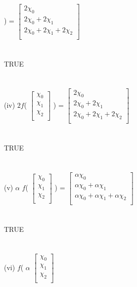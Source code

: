 \documentclass[11pt]{article}
\begin{document}
)
=
$
\begin{bmatrix}
{2\chi_{0}}\\
{2\chi_{0} + 2\chi_{1}}\\
{2\chi_{0} + 2\chi_{1} + 2\chi_{2}}\\
\end{bmatrix}$
\\
\\
\\
TRUE
\\
\\
\\
(iv)
$2f$(
$
\begin{bmatrix}
{\chi_{0}}\\
{\chi_{1}}\\
{\chi_{2}}\\
\end{bmatrix}$
)
=
$
\begin{bmatrix}
{2\chi_{0}}\\
{2\chi_{0} + 2\chi_{1}}\\
{2\chi_{0} + 2\chi_{1} + 2\chi_{2}}\\
\end{bmatrix}$
\\
\\
\\
TRUE
\\
\\
\\
(v)
$\alpha$ $f$(
$
\begin{bmatrix}
{\chi_{0}}\\
{\chi_{1}}\\
{\chi_{2}}\\
\end{bmatrix}$
)
=
$
\begin{bmatrix}
{\alpha\chi_{0}}\\
{\alpha\chi_{0} + \alpha\chi_{1}}\\
{\alpha\chi_{0} + \alpha\chi_{1} + \alpha\chi_{2}}\\
\end{bmatrix}$
\\
\\
\\
TRUE
\\
\\
\\
(vi)
$f$( $\alpha$
$
\begin{bmatrix}
{\chi_{0}}\\
{\chi_{1}}\\
{\chi_{2}}\\
\end{bmatrix}$
\end{document}
